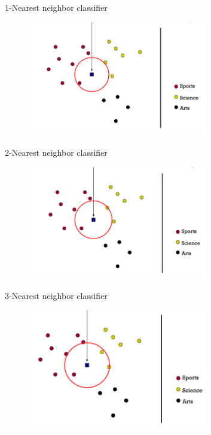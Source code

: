 \documentclass[serif, aspectratio=169]{beamer}
\begin{document}
\begin{frame}{1-Nearest neighbor classifier}
    \begin{figure}[h]
            \centering
            
            \includegraphics[width=0.7\textwidth]{pic/1NN.png}
            \end{figure}
\end{frame}
\begin{frame}{2-Nearest neighbor classifier}
    \begin{figure}[h]
            \centering
            
            \includegraphics[width=0.7\textwidth]{pic/2NN.png}
            \end{figure}
\end{frame}
\begin{frame}{3-Nearest neighbor classifier}
    \begin{figure}[h]
            \centering
            
            \includegraphics[width=0.7\textwidth]{pic/3NN.png}
            \end{figure}
\end{frame}
\end{document}
